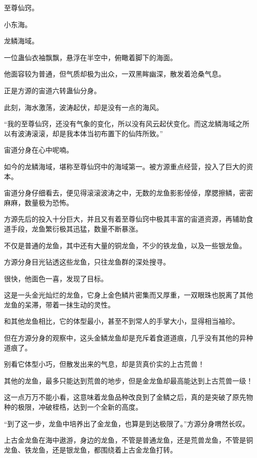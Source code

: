 
\begin{this_body}



至尊仙窍。

小东海。

龙鳞海域。

一位蛊仙衣袖飘飘，悬浮在半空中，俯瞰着脚下的海面。

他面容较为普通，但气质却极为出众，一双黑眸幽深，散发着沧桑气息。

正是方源的宙道六转蛊仙分身。

此刻，海水激荡，波涛起伏，却是没有一点的海风。

“我的至尊仙窍，还没有气象的变化，所以没有风云起伏变化。而这龙鳞海域之所以有波涛滚滚，却是我本体当初布置下的仙阵所致。”

宙道分身在心中呢喃。

如今的龙鳞海域，堪称至尊仙窍中的海域第一。被方源重点经营，投入了巨大的资本。

宙道分身仔细看去，便见得滚滚波涛之中，无数的龙鱼影影倬倬，摩腮擦鳞，密密麻麻，数量极为恐怖。

方源先后的投入十分巨大，并且又有着至尊仙窍中极其丰富的宙道资源，再辅助食道手段，龙鱼繁衍极其迅猛，数量不断暴涨。

不仅是普通的龙鱼，其中还有大量的铜龙鱼，不少的铁龙鱼，以及一些银龙鱼。

方源分身目光钻透这些龙鱼，只往龙鱼群的深处搜寻。

很快，他面色一喜，发现了目标。

这是一头金光灿烂的龙鱼，它身上金色鳞片密集而又厚重，一双眼珠也脱离了其他龙鱼的呆滞，带着一抹生动的灵性。

和其他龙鱼相比，它的体型最小，甚至不到常人的手掌大小，显得相当袖珍。

但在方源分身的观察中，这头金鳞龙鱼却是充斥着食道道痕，几乎没有其他的异种道痕了。

别看它体型小巧，但散发出来的气息，却是货真价实的上古荒兽！

其他的龙鱼，最多只能达到荒兽的地步，但是金龙鱼却最高能达到上古荒兽一级！

这一点万万不能小看，这意味着龙鱼品种改良到了金鳞之后，真的是突破了原先物种的极限，冲破桎梏，达到一个全新的高度。

“到了这一步，龙鱼中培养出了金龙鱼，也算是到达极限了。”方源分身喟然长叹。

上古金龙鱼在海中遨游，身边的龙鱼，不管是普通龙鱼，还是荒兽龙鱼，不管是铜龙鱼、铁龙鱼，还是银龙鱼，都围绕着上古金龙鱼打转。


\end{this_body}
